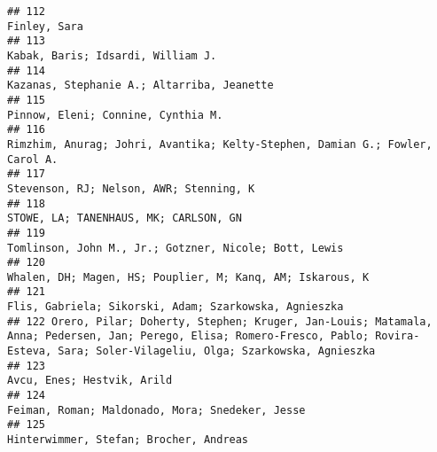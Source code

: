 \documentclass[
  english,
  man]{apa6}
\begin{document}
\begin{verbatim}
## 112                                                                                                                                                                             Finley, Sara
## 113                                                                                                                                                        Kabak, Baris; Idsardi, William J.
## 114                                                                                                                                               Kazanas, Stephanie A.; Altarriba, Jeanette
## 115                                                                                                                                                       Pinnow, Eleni; Connine, Cynthia M.
## 116                                                                                                             Rimzhim, Anurag; Johri, Avantika; Kelty-Stephen, Damian G.; Fowler, Carol A.
## 117                                                                                                                                                  Stevenson, RJ; Nelson, AWR; Stenning, K
## 118                                                                                                                                                    STOWE, LA; TANENHAUS, MK; CARLSON, GN
## 119                                                                                                                                    Tomlinson, John M., Jr.; Gotzner, Nicole; Bott, Lewis
## 120                                                                                                                                Whalen, DH; Magen, HS; Pouplier, M; Kanq, AM; Iskarous, K
## 121                                                                                                                                    Flis, Gabriela; Sikorski, Adam; Szarkowska, Agnieszka
## 122 Orero, Pilar; Doherty, Stephen; Kruger, Jan-Louis; Matamala, Anna; Pedersen, Jan; Perego, Elisa; Romero-Fresco, Pablo; Rovira-Esteva, Sara; Soler-Vilageliu, Olga; Szarkowska, Agnieszka
## 123                                                                                                                                                               Avcu, Enes; Hestvik, Arild
## 124                                                                                                                                          Feiman, Roman; Maldonado, Mora; Snedeker, Jesse
## 125                                                                                                                                                   Hinterwimmer, Stefan; Brocher, Andreas

\end{verbatim}
\end{document}
